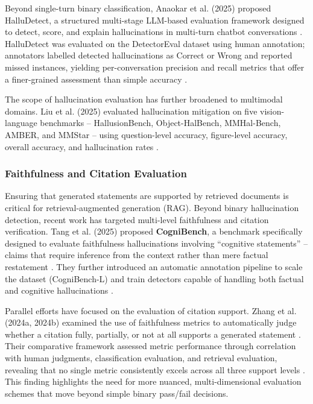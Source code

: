 \documentclass[11pt,a4paper]{article}
\begin{document}
Beyond single-turn binary classification, Anaokar et al. (2025) proposed HalluDetect, a structured multi-stage LLM-based evaluation framework designed to detect, score, and explain hallucinations in multi-turn chatbot conversations \cite{Anaokar_2025_Halludetect_9248653c}. HalluDetect was evaluated on the DetectorEval dataset using human annotation; annotators labelled detected hallucinations as Correct or Wrong and reported missed instances, yielding per-conversation precision and recall metrics that offer a finer-grained assessment than simple accuracy \cite{Anaokar_2025_Halludetect_9248653c}.

The scope of hallucination evaluation has further broadened to multimodal domains. Liu et al. (2025) evaluated hallucination mitigation on five vision-language benchmarks -- HallusionBench, Object-HalBench, MMHal-Bench, AMBER, and MMStar -- using question-level accuracy, figure-level accuracy, overall accuracy, and hallucination rates \cite{Liu_2025_Mitigating_b63ac3f0}.

\subsubsection{Faithfulness and Citation Evaluation}

Ensuring that generated statements are supported by retrieved documents is critical for retrieval-augmented generation (RAG). Beyond binary hallucination detection, recent work has targeted multi-level faithfulness and citation verification. Tang et al. (2025) proposed \textbf{CogniBench}, a benchmark specifically designed to evaluate faithfulness hallucinations involving ``cognitive statements'' -- claims that require inference from the context rather than mere factual restatement \cite{Tang_2025_Cognibench_0b308648}. They further introduced an automatic annotation pipeline to scale the dataset (CogniBench-L) and train detectors capable of handling both factual and cognitive hallucinations \cite{Tang_2025_Cognibench_0b308648}.

Parallel efforts have focused on the evaluation of citation support. Zhang et al. (2024a, 2024b) examined the use of faithfulness metrics to automatically judge whether a citation fully, partially, or not at all supports a generated statement \cite{Zhang_2024_Comparative_d35d7fec, Zhang_2024_Fine_79ed226e}. Their comparative framework assessed metric performance through correlation with human judgments, classification evaluation, and retrieval evaluation, revealing that no single metric consistently excels across all three support levels \cite{Zhang_2024_Comparative_d35d7fec}. This finding highlights the need for more nuanced, multi-dimensional evaluation schemes that move beyond simple binary pass/fail decisions.
\end{document}
